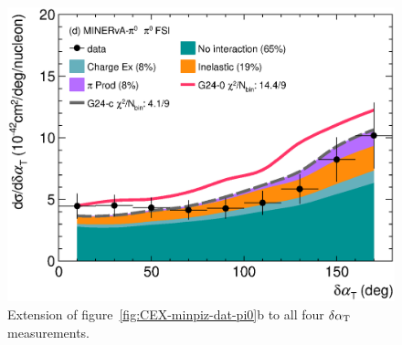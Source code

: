 \begin{figure}[!htb]
    \includegraphics[width=\dbfigwid\textwidth]{figures/tuning/0026-min_pi0_dalphat_pi0_decomp_covfix.eps}
    \caption{\label{fig:g24-c-dat-pi0} Extension of figure~\ref{fig:CEX-minpiz-dat-pi0}b to all four $\delta\alpha_\textrm{T}$ measurements. } 
		

\end{figure}
